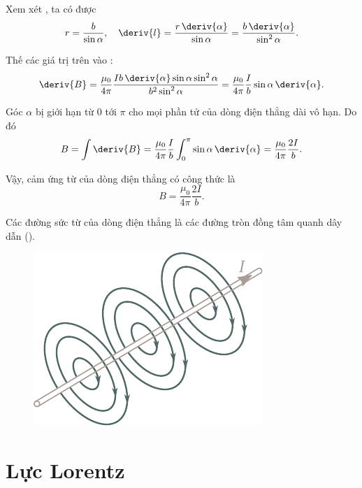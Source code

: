 Xem xét , ta có được
\begin{equation*}
    r = \frac{b}{\sin\alpha},\quad \deriv{l} = \frac{r\, \deriv{\alpha}}{\sin\alpha} = \frac{b\, \deriv{\alpha}}{\sin^2\alpha}.
\end{equation*}

\noindent
Thế các giá trị trên vào :
\begin{equation*}
    \deriv{B} = \frac{\mu_0}{4\pi} \frac{Ib\, \deriv{\alpha} \sin\alpha \sin^2\alpha}{b^2 \sin^2\alpha} = \frac{\mu_0}{4\pi} \frac{I}{b} \sin\alpha\, \deriv{\alpha}.
\end{equation*}

Góc $\alpha$ bị giới hạn từ $0$ tới $\pi$ cho mọi phần tử của dòng điện thẳng dài vô hạn. Do đó
\begin{equation*}
    B = \int \deriv{B} = \frac{\mu_0}{4\pi} \frac{I}{b} \int_0^{\pi} \sin\alpha\, \deriv{\alpha} = \frac{\mu_0}{4\pi} \frac{2I}{b}.
\end{equation*}

\noindent
Vậy, cảm ứng từ của dòng điện thẳng có công thức là
\begin{equation}\label{eq:6_30}
    B = \frac{\mu_0}{4\pi} \frac{2I}{b}.
\end{equation}

Các đường sức từ của dòng điện thẳng là các đường tròn đồng tâm quanh dây dẫn ().

\begin{figure}[t]
	\begin{center}
		\includegraphics[scale=1]{figures/ch_06/fig_6_5.pdf}
		\caption[]{}
		\label{fig:6_5}
	\end{center}
	\vspace{-0.8cm}
\end{figure}

\section{Lực Lorentz}\label{sec:6_5}

